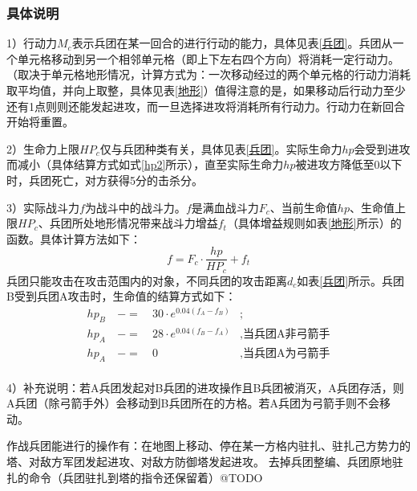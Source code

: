 \documentclass[a4paper,4pt]{article}
\begin{document}
\subsubsection{具体说明}
1）行动力$M_c$表示兵团在某一回合的进行行动的能力，具体见表\ref{兵团}。兵团从一个单元格移动到另一个相邻单元格（即上下左右四个方向）将消耗一定行动力。（取决于单元格地形情况，计算方式为：一次移动经过的两个单元格的行动力消耗取平均值，并向上取整，具体见表\ref{地形}）值得注意的是，如果移动后行动力至少还有1点则则还能发起进攻，而一旦选择进攻将消耗所有行动力。行动力在新回合开始将重置。\par
2）生命力上限$HP_c$仅与兵团种类有关，具体见表\ref{兵团}。实际生命力$hp$会受到进攻而减小（具体结算方式如式\ref{hp2}所示），直至实际生命力$hp$被进攻方降低至0以下时，兵团死亡，对方获得5分的击杀分。\par
3）实际战斗力$f$为战斗中的战斗力。$f$是满血战斗力$F_c$、当前生命值$hp$、生命值上限$HP_c$、兵团所处地形情况带来战斗力增益$f_t$（具体增益规则如表\ref{地形}所示）的函数。具体计算方法如下：
\begin{equation}
	f = F_c \cdot \frac{hp}{HP_c} + f_t\label{f2}
\end{equation}
兵团只能攻击在攻击范围内的对象，不同兵团的攻击距离$d_c$如表\ref{兵团}所示。兵团B受到兵团A攻击时，生命值的结算方式如下：
\begin{equation}
	\begin{aligned}
		hp_{B} & \ -= & \ 30 \cdot e^{0.04(f_{A}-f_{B})} & ;                        \\
		hp_{A} & \ -= & \ 28 \cdot e^{0.04(f_{B}-f_{A})} & , \text{当兵团A非弓箭手} \\
		hp_{A} & \ -= & \ 0                              & , \text{当兵团A为弓箭手} \\
	\end{aligned}
	\label{hp2}
\end{equation}\par
4）补充说明：若A兵团发起对B兵团的进攻操作且B兵团被消灭，A兵团存活，则A兵团（除弓箭手外）会移动到B兵团所在的方格。若A兵团为弓箭手则不会移动。

作战兵团能进行的操作有：在地图上移动、停在某一方格内驻扎、驻扎己方势力的塔、对敌方军团发起进攻、对敌方防御塔发起进攻。
去掉兵团整编、兵团原地驻扎的命令（兵团驻扎到塔的指令还保留着）@TODO%
\end{document}
